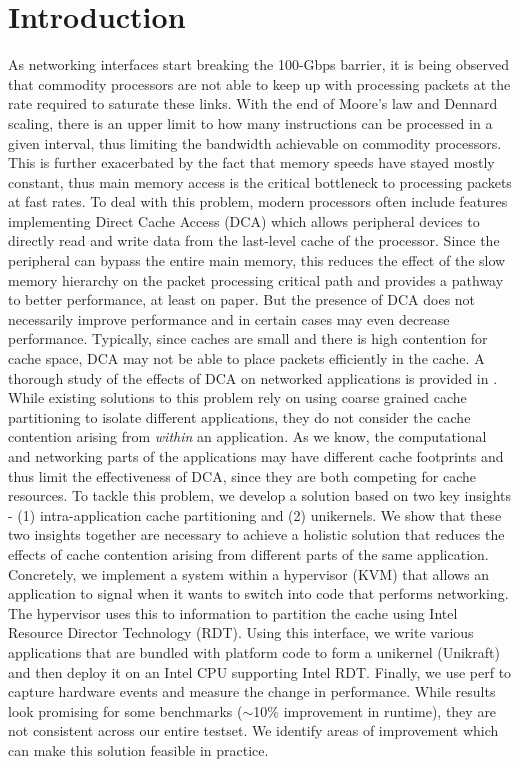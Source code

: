 \documentclass[sigconf,authorversion,noacm]{acmart}
\begin{document}
\maketitle

\section{Introduction}

As networking interfaces start breaking the 100-Gbps barrier, it is being
observed that commodity processors are not able to keep up with processing
packets at the rate required to saturate these links. With the end of Moore's
law and Dennard scaling, there is an upper limit to how many instructions can be
processed in a given interval, thus limiting the bandwidth achievable on
commodity processors. This is further exacerbated by the fact that memory speeds
have stayed mostly constant, thus main memory access is the critical bottleneck
to processing packets at fast rates. To deal with this problem, modern
processors often include features implementing Direct Cache Access (DCA) which
allows peripheral devices to directly read and write data from the last-level
cache of the processor. Since the peripheral can bypass the entire main memory,
this reduces the effect of the slow memory hierarchy on the packet processing
critical path and provides a pathway to better performance, at least on paper.
But the presence of DCA does not necessarily improve performance and in certain
cases may even decrease performance. Typically, since caches are small and there
is high contention for cache space, DCA may not be able to place packets
efficiently in the cache. A thorough study of the effects of DCA on networked
applications is provided in \cite{alireza_2020}. While existing solutions to
this problem rely on using coarse grained cache partitioning to isolate
different applications, they do not consider the cache contention arising from
\textit{within} an application. As we know, the computational and networking
parts of the applications may have different cache footprints and thus limit the
effectiveness of DCA, since they are both competing for cache resources. To
tackle this problem, we develop a solution based on two key insights - (1)
intra-application cache partitioning and (2) unikernels. We show that these two
insights together are necessary to achieve a holistic solution that reduces the
effects of cache contention arising from different parts of the same
application. Concretely, we implement a system within a hypervisor (KVM) that
allows an application to signal when it wants to switch into code that performs
networking. The hypervisor uses this to information to partition the cache using
Intel Resource Director Technology (RDT). Using this interface, we write various
applications that are bundled with platform code to form a unikernel (Unikraft)
and then deploy it on an Intel CPU supporting Intel RDT. Finally, we use perf to
capture hardware events and measure the change in performance. While results
look promising for some benchmarks ($\sim$10$\%$ improvement in runtime), they
are not consistent across our entire testset. We identify areas of improvement
which can make this solution feasible in practice.
\end{document}
